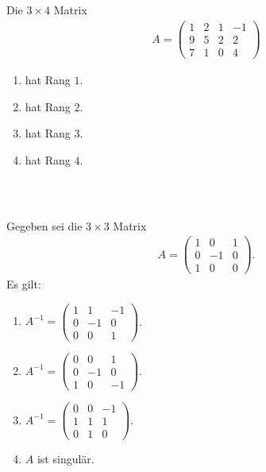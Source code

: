 \subsection*{}
Die $3 \times 4$ Matrix
\begin{align*}
A
=
\begin{pmatrix}
1 & 2  & 1 & -1  \\
9 & 5  & 2 & 2 \\
7 & 1  & 0 &  4  
\end{pmatrix}
\end{align*}
\renewcommand{\labelenumi}{(\alph{enumi})}
\begin{enumerate}
\item 
hat Rang $1$.
\item
hat Rang $2$.
\item
hat Rang $3$.
\item
hat Rang $4$.
\end{enumerate}
\ \\
\subsection*{}
Gegeben sei die $ 3 \times 3 $ Matrix
\begin{align*}
A =
\begin{pmatrix}
1 & 0 & 1 \\
0 & -1 & 0 \\
1 & 0 &0
\end{pmatrix}.
\end{align*}
Es gilt:
\renewcommand{\labelenumi}{(\alph{enumi})}
\begin{enumerate}
\item 
$A^{-1}
= 
\begin{pmatrix}
1 & 1 & -1  \\
0 & -1 & 0 \\
0 & 0 & 1
\end{pmatrix}$.
\item 
$A^{-1}
= 
\begin{pmatrix}
0 & 0 & 1  \\
0 & -1 & 0 \\
1 & 0 & -1
\end{pmatrix}$.
\item
$A^{-1}
= 
\begin{pmatrix}
0 & 0 & -1  \\
1 & 1 & 1 \\
0 & 1 & 0
\end{pmatrix}$.
\item
$ A $ ist singulär.
\end{enumerate}
\ \\
